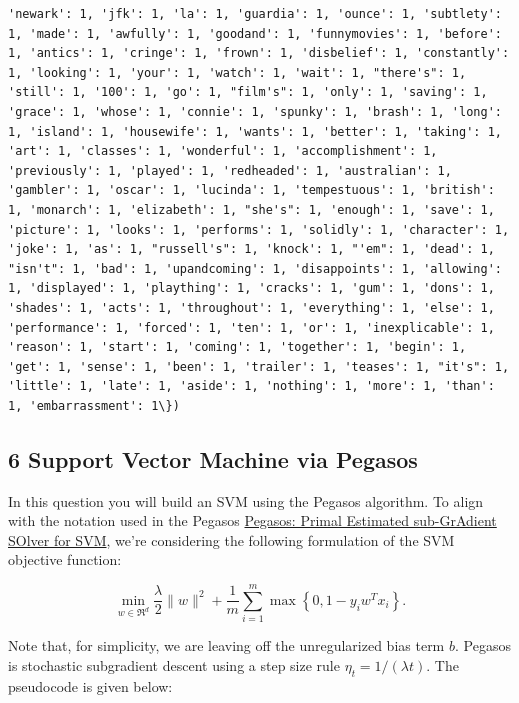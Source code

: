 \documentclass[11pt]{article}
\begin{document}
\begin{Verbatim}[commandchars=\\\{\}]
'newark': 1, 'jfk': 1, 'la': 1, 'guardia': 1, 'ounce': 1, 'subtlety': 1, 'made': 1, 'awfully': 1, 'goodand': 1, 'funnymovies': 1, 'before': 1, 'antics': 1, 'cringe': 1, 'frown': 1, 'disbelief': 1, 'constantly': 1, 'looking': 1, 'your': 1, 'watch': 1, 'wait': 1, "there's": 1, 'still': 1, '100': 1, 'go': 1, "film's": 1, 'only': 1, 'saving': 1, 'grace': 1, 'whose': 1, 'connie': 1, 'spunky': 1, 'brash': 1, 'long': 1, 'island': 1, 'housewife': 1, 'wants': 1, 'better': 1, 'taking': 1, 'art': 1, 'classes': 1, 'wonderful': 1, 'accomplishment': 1, 'previously': 1, 'played': 1, 'redheaded': 1, 'australian': 1, 'gambler': 1, 'oscar': 1, 'lucinda': 1, 'tempestuous': 1, 'british': 1, 'monarch': 1, 'elizabeth': 1, "she's": 1, 'enough': 1, 'save': 1, 'picture': 1, 'looks': 1, 'performs': 1, 'solidly': 1, 'character': 1, 'joke': 1, 'as': 1, "russell's": 1, 'knock': 1, "'em": 1, 'dead': 1, "isn't": 1, 'bad': 1, 'upandcoming': 1, 'disappoints': 1, 'allowing': 1, 'displayed': 1, 'plaything': 1, 'cracks': 1, 'gum': 1, 'dons': 1, 'shades': 1, 'acts': 1, 'throughout': 1, 'everything': 1, 'else': 1, 'performance': 1, 'forced': 1, 'ten': 1, 'or': 1, 'inexplicable': 1, 'reason': 1, 'start': 1, 'coming': 1, 'together': 1, 'begin': 1, 'get': 1, 'sense': 1, 'been': 1, 'trailer': 1, 'teases': 1, "it's": 1, 'little': 1, 'late': 1, 'aside': 1, 'nothing': 1, 'more': 1, 'than': 1, 'embarrassment': 1\})

    \end{Verbatim}

    \hypertarget{support-vector-machine-via-pegasos}{%
\subsection{6 Support Vector Machine via
Pegasos}\label{support-vector-machine-via-pegasos}}

In this question you will build an SVM using the Pegasos algorithm. To
align with the notation used in the Pegasos
\href{http://ttic.uchicago.edu/~nati/Publications/PegasosMPB.pdf}{Pegasos:
Primal Estimated sub-GrAdient SOlver for SVM}, we're considering the
following formulation of the SVM objective function:

\[
\min_{w\in\Re^{d}}\frac{\lambda}{2}\|w\|^{2}+\frac{1}{m}\sum_{i=1}^{m}\max\left\{ 0,1-y_{i}w^{T}x_{i}\right\} .
\]

Note that, for simplicity, we are leaving off the unregularized bias
term \(b\). Pegasos is stochastic subgradient descent using a step size
rule \(\eta_{t}=1/\left(\lambda t\right)\). The pseudocode is given
below: 
\end{document}
